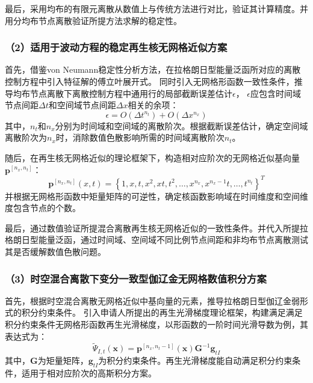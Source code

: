 最后，采用均布的有限元离散从数值上与传统方法进行对比，验证其计算精度。并用分均布节点离散验证所提方法求解的稳定性。

\subsubsection*{\bfseries （2）适用于波动方程的稳定再生核无网格近似方案}
首先，借鉴von Neumann稳定性分析方法，在拉格朗日型能量泛函所对应的离散控制方程中引入特征解的傅立叶展开式。
同时引入无网格形函数一致性条件，推导均布节点离散下离散控制方程中通用行的局部截断误差估计$\epsilon$，
$\epsilon$应包含时间域节点间距$\Delta t$和空间域节点间距$\Delta x$相关的余项：
\begin{equation}
    \epsilon = O(\Delta t^{n_t}) + O(\Delta x^{n_x})
\end{equation}
其中，$n_t$和$n_x$分别为时间域和空间域的离散阶次。根据截断误差估计，确定空间域离散阶次为$n_x$时，消除数值色散影响所需的时间域离散阶次$n_t$。

随后，在再生核无网格近似的理论框架下，构造相对应阶次的无网格近似基向量$\boldsymbol p^{[n_x,n_t]}$：
\begin{equation}
    \boldsymbol p^{[n_x,n_t]}(x,t) = \left \{1, x, t, x^2, xt, t^2, \dots, x^{n_x}, x^{n_x-1}t, \dots, t^{n_t} \right \}^T
\end{equation}
并根据无网格形函数中矩量矩阵的可逆性，确定核函数影响域在时间维度和空间维度包含节点的个数。

    

最后，通过数值验证所提混合离散再生核无网格近似的一致性条件。并代入所提拉格朗日型能量泛函，通过时间域、空间域不同比例节点间距和非均布节点离散测试其是否缓解数值色散问题。

\subsubsection*{\bfseries （3）时空混合离散下变分一致型伽辽金无网格数值积分方案}
首先，根据时空混合离散无网格近似中基向量的元素，推导拉格朗日型伽辽金弱形式的积分约束条件。
引入申请人所提出的再生光滑梯度理论框架，构建满足满足积分约束条件无网格形函数再生光滑梯度，以形函数的一阶时间光滑导数为例，其表达式为：
\begin{equation}
    \tilde \Psi_{I,t}(\boldsymbol x) = \boldsymbol p^{[n_x,n_t - 1]}(\boldsymbol x) \boldsymbol G^{ - 1} \boldsymbol g_{tI}
\end{equation}
其中，$\boldsymbol G$为矩量矩阵，$\boldsymbol g_{tI}$为积分约束条件。再生光滑梯度能自动满足积分约束条件，适用于相对应阶次的高斯积分方案。

